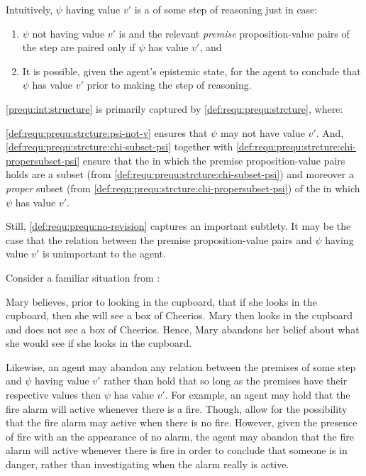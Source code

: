\begin{note}
  Intuitively, \(\psi\) having value \(v'\) is a \prequ{} of some step of reasoning just in case:
  \begin{enumerate}[label=\arabic*., ref=(\arabic*)]
  \item
    \label{prequ:int:structure}
    \(\psi\) not having value \(v'\) is \epVAd{} and the relevant \emph{premise} proposition-value pairs of the step are paired only if \(\psi\) has value \(v'\), and
  \item
    \label{prequ:int:reasoning}
    It is possible, given the agent's epistemic state, for the agent to conclude that \(\psi\) has value \(v'\) prior to making the step of reasoning.
  \end{enumerate}
  \ref{prequ:int:structure} is primarily captured by \ref{def:requ:prequ:strcture}, where:

  \ref{def:requ:prequ:strcture:psi-not-v} ensures that \(\psi\) may not have value \(v'\).
  And, \ref{def:requ:prequ:strcture:chi-subset-psi} together with \ref{def:requ:prequ:strcture:chi-propersubset-psi} ensure that the  in which the premise proposition-value pairs holds are a subset (from \ref{def:requ:prequ:strcture:chi-subset-psi}) and moreover a \emph{proper} subset (from \ref{def:requ:prequ:strcture:chi-propersubset-psi}) of the  in which \(\psi\) has value \(v'\).

  Still, \ref{def:requ:prequ:no-revision} captures an important subtlety.
  It may be the case that the relation between the premise proposition-value pairs and \(\psi\) having value \(v'\) is unimportant to the agent.

  Consider a familiar situation from \citeauthor{Harman:1986ux}:

  Mary believes, prior to looking in the cupboard, that if she looks in the cupboard, then she will see a box of Cheerios.
  Mary then looks in the cupboard and does not see a box of Cheerios.
  Hence, Mary abandons her belief about what she would see if she looks in the cupboard.

  Likewise, an agent may abandon any relation between the premises of some step and \(\psi\) having value \(v'\) rather than hold that so long as the premises have their respective values then \(\psi\) has value \(v'\).
  For example, an agent may hold that the fire alarm will active whenever there is a fire.
  Though, allow for the possibility that the fire alarm may active when there is no fire.
  However, given the presence of fire with an the appearance of no alarm, the agent may abandon that the fire alarm will active whenever there is fire in order to conclude that someone is in danger, rather than investigating when the alarm really is active.


\end{note}
